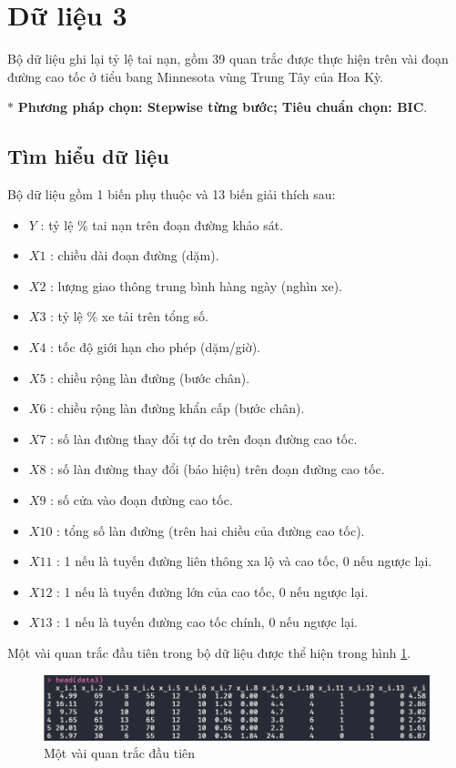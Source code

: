 \section{Dữ liệu 3}

Bộ dữ liệu ghi lại tỷ lệ tai nạn, gồm 39 quan trắc được thực hiện trên vài đoạn đường cao tốc ở tiểu bang Minnesota vùng Trung Tây của Hoa Kỳ.

$*$ \textbf{Phương pháp chọn: Stepwise từng bước; Tiêu chuẩn chọn: BIC}.

\subsection*{Tìm hiểu dữ liệu}

Bộ dữ liệu gồm 1 biến phụ thuộc và 13 biến giải thích sau:
\begin{itemize}[label=--]
	\item $Y$ : tỷ lệ \% tai nạn trên đoạn đường khảo sát.
	\item $X1$ : chiều dài đoạn đường (dặm).
	\item $X2$ : lượng giao thông trung bình hàng ngày (nghìn xe).
	\item $X3$ : tỷ lệ \% xe tải trên tổng số.
	\item $X4$ : tốc độ giới hạn cho phép (dặm/giờ).
	\item $X5$ : chiều rộng làn đường (bước chân).
	\item $X6$ : chiều rộng làn đường khẩn cấp (bước chân).
	\item $X7$ : số làn đường thay đổi tự do trên đoạn đường cao tốc.
	\item $X8$ : số làn đường thay đổi (báo hiệu) trên đoạn đường cao tốc.
	\item $X9$ : số cửa vào đoạn đường cao tốc.
	\item $X10$ : tổng số làn đường (trên hai chiều của đường cao tốc).
	\item $X11$ : 1 nếu là tuyến đường liên thông xa lộ và cao tốc, 0 nếu ngược lại.
	\item $X12$ : 1 nếu là tuyến đường lớn của cao tốc, 0 nếu ngược lại.
	\item $X13$ : 1 nếu là tuyến đường cao tốc chính, 0 nếu ngược lại.
\end{itemize}

Một vài quan trắc đầu tiên trong bộ dữ liệu được thể hiện trong hình \ref{fig-b3:head-dataset}.
\begin{figure}[H]
	\centering
	\includegraphics[width=0.8\linewidth]{images/B3/head-dataset}
	\caption{Một vài quan trắc đầu tiên}
	\label{fig-b3:head-dataset}
\end{figure}

